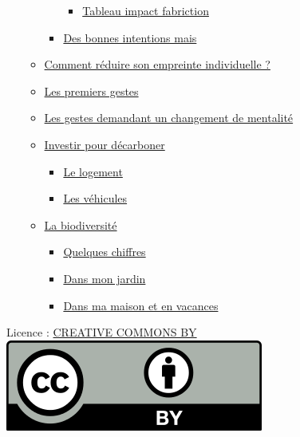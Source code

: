 \begin{itemize}
\begin{itemize}
\begin{itemize}
      \begin{itemize}
      \tightlist
      \item
        \protect\hyperlink{tableau-impact-fabriction}{Tableau impact
        fabriction}
      \end{itemize}
    \item
      \protect\hyperlink{des-bonnes-intentions-mais}{Des bonnes
      intentions mais}
    \end{itemize}
  \item
    \protect\hyperlink{comment-ruxe9duire-son-empreinte-individuelle-}{Comment
    réduire son empreinte individuelle ?}
  \item
    \protect\hyperlink{les-premiers-gestes}{Les premiers gestes}
  \item
    \protect\hyperlink{les-gestes-demandant-un-changement-de-mentalituxe9}{Les
    gestes demandant un changement de mentalité}
  \item
    \protect\hyperlink{investir-pour-duxe9carboner}{Investir pour
    décarboner}

    \begin{itemize}
    \tightlist
    \item
      \protect\hyperlink{le-logement}{Le logement}
    \item
      \protect\hyperlink{les-vuxe9hicules}{Les véhicules}
    \end{itemize}
  \item
    \protect\hyperlink{la-biodiversituxe9}{La biodiversité}

    \begin{itemize}
    \tightlist
    \item
      \protect\hyperlink{quelques-chiffres}{Quelques chiffres}
    \item
      \protect\hyperlink{dans-mon-jardin}{Dans mon jardin}
    \item
      \protect\hyperlink{dans-ma-maison-et-en-vacances}{Dans ma maison
      et en vacances}
    \end{itemize}
  \end{itemize}
\end{itemize}

Licence : \href{LICENSE.txt}{CREATIVE COMMONS BY}\\
\includegraphics{img/CC-BY_icon.svg.png}

